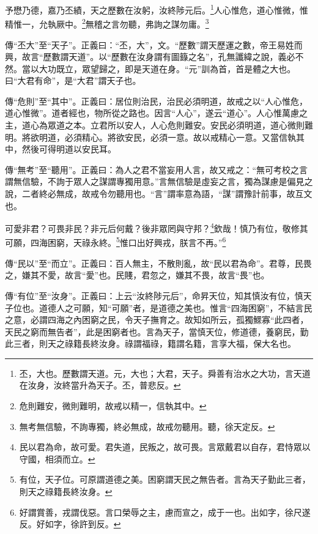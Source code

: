 予懋乃德，嘉乃丕績，天之歷數在汝躬，汝終陟元后。\footnote{丕，大也。歷數謂天道。元，大也；大君，天子。舜善有治水之大功，言天道在汝身，汝終當升為天子。丕，普悲反。}人心惟危，道心惟微，惟精惟一，允執厥中。\footnote{危則難安，微則難明，故戒以精一，信執其中。}無稽之言勿聽，弗詢之謀勿庸。\footnote{無考無信驗，不詢專獨，終必無成，故戒勿聽用。聽，徐天定反。}

{\noindent\zhuan{}\fzbyks 傳“丕大”至“天子”。正義曰：“丕，大”，文。“歷數”謂天歷運之數，帝王易姓而興，故言“歷數謂天道”。以“歷數在汝身謂有圖籙之名”，孔無讖緯之說，義必不然。當以大功既立，眾望歸之，即是天道在身。“元”訓為首，首是體之大也。曰“大君有命”，是“大君”謂天子也。 \par}

{\noindent\zhuan{}\fzbyks 傳“危則”至“其中”。正義曰：居位則治民，治民必須明道，故戒之以“人心惟危，道心惟微”。道者經也，物所從之路也。因言“人心”，遂云“道心”。人心惟萬慮之主，道心為眾道之本。立君所以安人，人心危則難安。安民必須明道，道心微則難明。將欲明道，必須精心。將欲安民，必須一意。故以戒精心一意。又當信執其中，然後可得明道以安民耳。 \par}

{\noindent\zhuan{}\fzbyks 傳“無考”至“聽用”。正義曰：為人之君不當妄用人言，故又戒之：“無可考校之言謂無信驗，不詢于眾人之謀謂專獨用意。”言無信驗是虛妄之言，獨為謀慮是偏見之說，二者終必無成，故戒令勿聽用也。“言”謂率意為語，“謀”謂豫計前事，故互文也。 \par}

可愛非君？可畏非民？非元后何戴？後非眾罔與守邦？\footnote{民以君為命，故可愛。君失道，民叛之，故可畏。言眾戴君以自存，君恃眾以守國，相須而立。}欽哉！慎乃有位，敬修其可願，四海困窮，天祿永終。\footnote{有位，天子位。可原謂道德之美。困窮謂天民之無告者。言為天子勤此三者，則天之祿籍長終汝身。}惟口出好興戎，朕言不再。”\footnote{好謂賞善，戎謂伐惡。言口榮辱之主，慮而宣之，成于一也。出如字，徐尺遂反。好如字，徐許到反。}

{\noindent\zhuan{}\fzbyks 傳“民以”至“而立”。正義曰：百人無主，不散則亂，故“民以君為命”。君尊，民畏之，嫌其不愛，故言“愛”也。民賤，君忽之，嫌其不畏，故言“畏”也。 \par}

{\noindent\zhuan{}\fzbyks 傳“有位”至“汝身”。正義曰：上云“汝終陟元后”，命昇天位，知其慎汝有位，慎天子位也。道德人之可願，知“可願”者，是道德之美也。惟言“四海困窮”，不結言民之意，必謂四海之內困窮之民，令天子撫育之。故知如所云，孤獨鰥寡“此四者，天民之窮而無告者”，此是困窮者也。言為天子，當慎天位，修道德，養窮民，勤此三者，則天之祿籍長終汝身。祿謂福祿，籍謂名籍，言享大福，保大名也。 \par}

